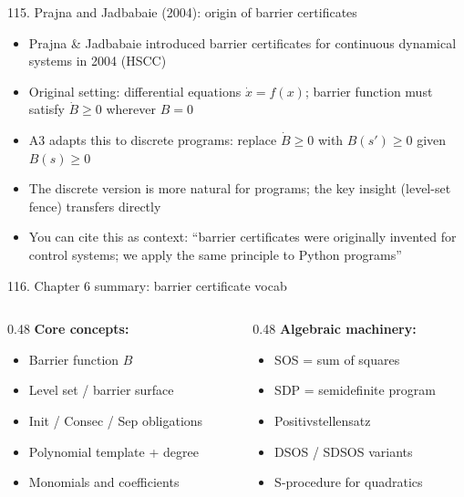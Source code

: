 \documentclass[aspectratio=169]{beamer}
\begin{document}
\begin{frame}{115. Prajna and Jadbabaie (2004): origin of barrier certificates}
\begin{itemize}
  \item Prajna \& Jadbabaie introduced barrier certificates for continuous dynamical systems in 2004 (HSCC)
  \item Original setting: differential equations \(\dot{x} = f(x)\); barrier function must satisfy \(\dot{B} \ge 0\) wherever \(B = 0\)
  \item A3 adapts this to discrete programs: replace \(\dot{B} \ge 0\) with $B(s')\ge0$ given $B(s)\ge0$
  \item The discrete version is more natural for programs; the key insight (level-set fence) transfers directly
  \item You can cite this as context: ``barrier certificates were originally invented for control systems; we apply the same principle to Python programs''
\end{itemize}
\end{frame}

\begin{frame}{116. Chapter 6 summary: barrier certificate vocab}
\begin{columns}
\begin{column}{0.48\textwidth}
\textbf{Core concepts:}
\begin{itemize}
  \item Barrier function $B$
  \item Level set / barrier surface
  \item Init / Consec / Sep obligations
  \item Polynomial template + degree
  \item Monomials and coefficients
\end{itemize}
\end{column}
\begin{column}{0.48\textwidth}
\textbf{Algebraic machinery:}
\begin{itemize}
  \item SOS = sum of squares
  \item SDP = semidefinite program
  \item Positivstellensatz
  \item DSOS / SDSOS variants
  \item S-procedure for quadratics
\end{itemize}
\end{column}
\end{columns}
\end{frame}
\end{document}
